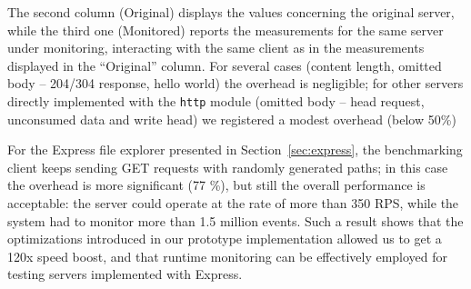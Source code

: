The second column (Original) displays the values concerning the original server, while the third one
(Monitored) reports the measurements for the same server under monitoring, interacting with the same client as in the measurements displayed in the ``Original'' column.
For several cases (content length, omitted body -- 204/304 response, hello world) the overhead is negligible;
for other servers directly implemented with the \lstinline{http} module (omitted body -- head request, unconsumed data and write head)
we registered a modest overhead (below 50\%)

For the Express file explorer presented in Section~\ref{sec:express}, the benchmarking client keeps sending GET requests
with randomly generated paths; in this case the overhead is more significant (77 \%), but still the overall performance
is acceptable: the server could operate at the rate of more than 350 RPS, while the system had to monitor more than 1.5 million events.
Such a result shows that the optimizations introduced in our prototype implementation allowed us
to get a 120x speed boost, and that runtime monitoring can be effectively employed for testing servers implemented with Express.
